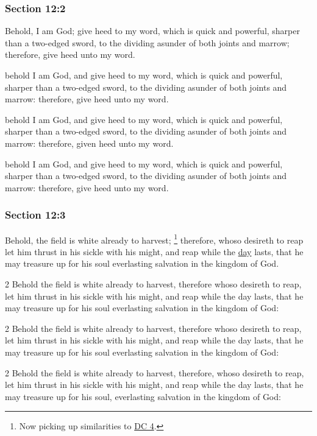 	\subsubsection{Section 12:2} %
		\label{DC12-2}

		Behold, I am God; give heed to my word, which is quick and powerful, sharper than a two-edged sword, to the dividing asunder of both joints and marrow; therefore, give heed unto my word.

		\begin{framed}
		\scriptsize
			\begin{compactdesc}
				\item[JSP] behold I am God, and give heed to my word, which is quick and powerful, sharper than a two-edged sword, to the dividing asunder of both joints and marrow: therefore, give heed unto my word.
				\item[DC 1835] behold I am God, and give heed to my word, which is quick and powerful, sharper than a two-edged sword, to the dividing asunder of both joints and marrow: therefore, given heed unto my word.
				\item[DC 1844] behold I am God, and give heed to my word, which is quick and powerful, sharper than a two-edged sword, to the dividing asunder of both joints and marrow: therefore, give heed unto my word.
			\end{compactdesc}
		\end{framed}

	\subsubsection{Section 12:3} %
		\label{DC12-3}

		Behold, the field is white already to harvest;%
			\footnote{%
				Now picking up similarities to \hyperref[DC4]{DC 4}.
				}
		therefore, whoso desireth to reap let him thrust in his sickle with his might, and reap while the \hyperref[DAY]{day} lasts, that he may treasure up for his soul everlasting salvation in the kingdom of God.

		\begin{framed}
		\scriptsize
			\begin{compactdesc}
				\item[JSP] 2 Behold the field is white already to harvest, therefore whoso desireth to reap, let him thrust in his sickle with his might, and reap while the day lasts, that he may treasure up for his soul everlasting salvation in the kingdom of God:
				\item[DC 1835] 2 Behold the field is white already to harvest, therefore whoso desireth to reap, let him thrust in his sickle with his might, and reap while the day lasts, that he may treasure up for his soul everlasting salvation in the kingdom of God: 
				\item[DC 1844] 2 Behold the field is white already to harvest, therefore, whoso desireth to reap, let him thrust in his sickle with his might, and reap while the day lasts, that he may treasure up for his soul, everlasting salvation in the kingdom of God: 
			\end{compactdesc}
		\end{framed}

